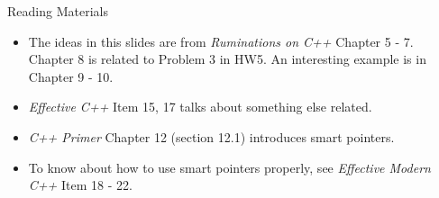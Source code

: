 \documentclass{beamer}
\begin{document}
\begin{frame}{Reading Materials}
    \begin{itemize}
        \item The ideas in this slides are from \textit{Ruminations on C++} Chapter 5 - 7. Chapter 8 is related to Problem 3 in HW5. An interesting example is in Chapter 9 - 10.
        \item \textit{Effective C++} Item 15, 17 talks about something else related.
        \item \textit{C++ Primer} Chapter 12 (section 12.1) introduces smart pointers.
        \item To know about how to use smart pointers properly, see \textit{Effective Modern C++} Item 18 - 22.
    \end{itemize}
\end{frame}
\end{document}
